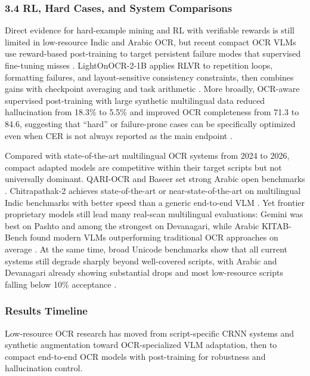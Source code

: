     
    \subsubsection*{3.4 RL, Hard Cases, and System Comparisons}
    
    
    Direct evidence for hard-example mining and RL with verifiable rewards is still limited in low-resource Indic and Arabic OCR, but recent compact OCR VLMs use reward-based post-training to target persistent failure modes that supervised fine-tuning misses  \cite{Taghadouini2026LightOnOCR:}. LightOnOCR-2-1B applies RLVR to repetition loops, formatting failures, and layout-sensitive consistency constraints, then combines gains with checkpoint averaging and task arithmetic  \cite{Taghadouini2026LightOnOCR:}. More broadly, OCR-aware supervised post-training with large synthetic multilingual data reduced hallucination from 18.3\% to 5.5\% and improved OCR completeness from 71.3 to 84.6, suggesting that “hard” or failure-prone cases can be specifically optimized even when CER is not always reported as the main endpoint  \cite{Xu2026Multilingual}.
    
    
    Compared with state-of-the-art multilingual OCR systems from 2024 to 2026, compact adapted models are competitive within their target scripts but not universally dominant. QARI-OCR and Baseer set strong Arabic open benchmarks  \cite{Wasfy2025QARI-OCR:} \cite{Hennara2025Baseer:}. Chitrapathak-2 achieves state-of-the-art or near-state-of-the-art on multilingual Indic benchmarks with better speed than a generic end-to-end VLM  \cite{Faraz2026Designing}. Yet frontier proprietary models still lead many real-scan multilingual evaluations: Gemini was best on Pashto and among the strongest on Devanagari, while Arabic KITAB-Bench found modern VLMs outperforming traditional OCR approaches on average  \cite{Haq2026PsOCR:} \cite{Singh2026Can} \cite{Heakl2025KITAB-Bench:}. At the same time, broad Unicode benchmarks show that all current systems still degrade sharply beyond well-covered scripts, with Arabic and Devanagari already showing substantial drops and most low-resource scripts falling below 10\% acceptance  \cite{Kargaran2026GlotOCR}.
    
    
    \subsubsection*{Results Timeline}
    
    
    Low-resource OCR research has moved from script-specific CRNN systems and synthetic augmentation toward OCR-specialized VLM adaptation, then to compact end-to-end OCR models with post-training for robustness and hallucination control.
    
